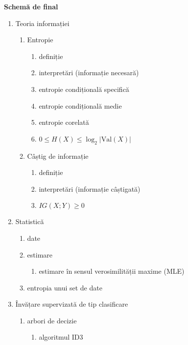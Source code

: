 \documentclass[12pt]{article}
\begin{document}
	\newpage
	\textbf{\large{Schemă de final}}
	\begin{enumerate}
		\item Teoria informației
		\begin{enumerate}
			\item Entropie
			\begin{enumerate}
				\item definiție
				\item interpretări (informație necesară)
				\item entropie condițională specifică
				\item entropie condițională medie
				\item entropie corelată
				\item $0 \leq H(X) \leq \log_2|\text{Val}(X)|$
			\end{enumerate}
			\item Câștig de informație
			\begin{enumerate}
				\item definiție
				\item interpretări (informație câștigată)
				\item $IG(X;Y) \geq 0$
			\end{enumerate}
		\end{enumerate}
		\item Statistică
		\begin{enumerate}
			\item date
			\item estimare
			\begin{enumerate}
				\item estimare în sensul verosimilității maxime (MLE)
			\end{enumerate}
			\item entropia unui set de date
		\end{enumerate}
		\item Învățare supervizată de tip clasificare
		\begin{enumerate}
			\item arbori de decizie
			\begin{enumerate}
				\item algoritmul ID3
			\end{enumerate}
		\end{enumerate}
	\end{enumerate}
	
\end{document}
